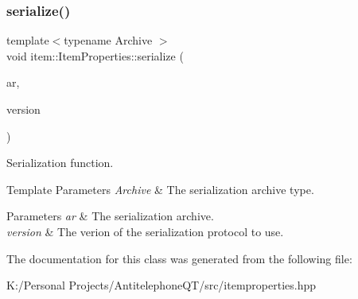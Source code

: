 \subsubsection{\texorpdfstring{serialize()}{serialize()}}
{\footnotesize\ttfamily template$<$typename Archive $>$ \\
void item\+::\+Item\+Properties\+::serialize (\begin{DoxyParamCaption}\item[{Archive \&}]{ar,  }\item[{unsigned int const}]{version }\end{DoxyParamCaption})\hspace{0.3cm}{\ttfamily [inline]}}



Serialization function. 


\begin{DoxyTemplParams}{Template Parameters}
{\em Archive} & The serialization archive type. \\
\hline
\end{DoxyTemplParams}

\begin{DoxyParams}{Parameters}
{\em ar} & The serialization archive. \\
\hline
{\em version} & The verion of the serialization protocol to use. \\
\hline
\end{DoxyParams}


The documentation for this class was generated from the following file\+:\begin{DoxyCompactItemize}
\item 
K\+:/\+Personal Projects/\+Antitelephone\+Q\+T/src/itemproperties.\+hpp\end{DoxyCompactItemize}
